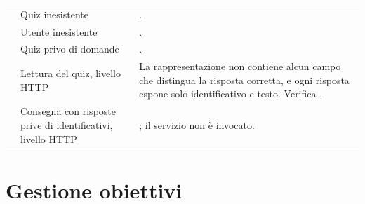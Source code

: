 \begin{longtable}{@{}l L{5.0cm} L{7.4cm}@{}}
 & Quiz inesistente & . \\
 & Utente inesistente & . \\
 & Quiz privo di domande & . \\

 & Lettura del quiz, livello HTTP &
La rappresentazione non contiene alcun campo che distingua la risposta
corretta, e ogni risposta espone solo identificativo e testo. Verifica
. \\

 & Consegna con risposte prive di identificativi, livello HTTP &
; il servizio non è invocato. \\

\end{longtable}

\section{Gestione obiettivi}

